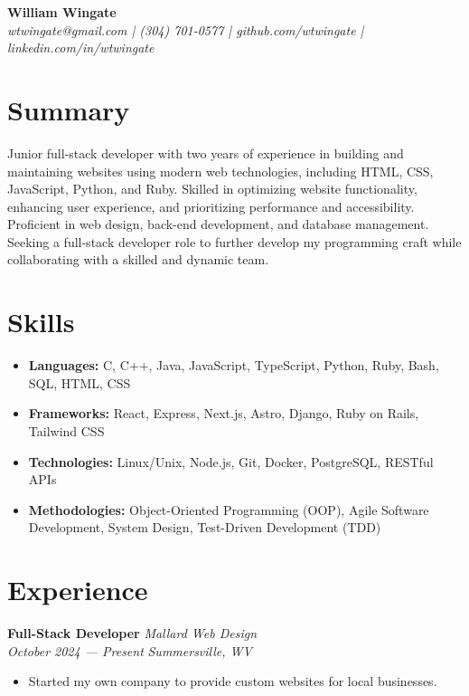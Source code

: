 \documentclass[letterpaper, 11pt]{article}
\begin{document}
\thispagestyle{empty}


\begin{center}
  {\LARGE \textbf{William Wingate}} \\
  \vspace{10pt}
  \textit{wtwingate@gmail.com | (304) 701-0577 | github.com/wtwingate
    | linkedin.com/in/wtwingate}
\end{center}


\section*{Summary}
Junior full-stack developer with two years of experience in building
and maintaining websites using modern web technologies, including
HTML, CSS, JavaScript, Python, and Ruby.  Skilled in optimizing
website functionality, enhancing user experience, and prioritizing
performance and accessibility.  Proficient in web design, back-end
development, and database management.  Seeking a full-stack developer
role to further develop my programming craft while collaborating with
a skilled and dynamic team.


\section*{Skills}
\begin{itemize}
\item \textbf{Languages:} C, C++, Java, JavaScript, TypeScript,
  Python, Ruby, Bash, SQL, HTML, CSS
\item \textbf{Frameworks:} React, Express, Next.js, Astro, Django,
  Ruby on Rails, Tailwind CSS
\item \textbf{Technologies:} Linux/Unix, Node.js, Git, Docker,
  PostgreSQL, RESTful APIs
\item \textbf{Methodologies:} Object-Oriented Programming (OOP), Agile
  Software Development, System Design, Test-Driven Development (TDD)
\end{itemize}


\section*{Experience}
\textbf{Full-Stack Developer}
\hfill \textit{Mallard Web Design} \\
\textit{October 2024 — Present}
\hfill \textit{Summersville, WV}
\begin{itemize}
\item Started my own company to provide custom websites for local
  businesses.
\end{itemize}
\end{document}
